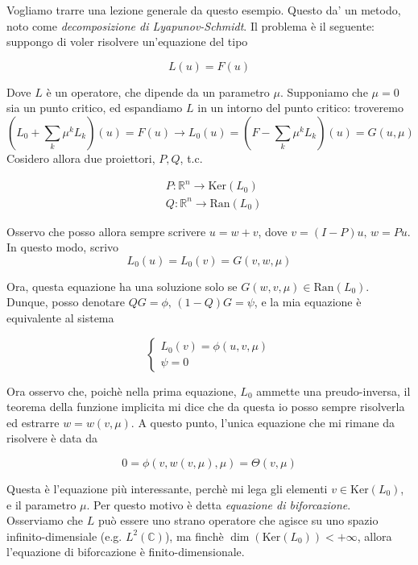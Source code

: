 \documentclass{report}
\begin{document}
Vogliamo trarre una lezione generale da questo esempio. Questo da' un metodo, noto come \emph{decomposizione di Lyapunov-Schmidt}. Il problema è il seguente: suppongo di voler risolvere un'equazione del tipo 

\begin{equation}
    L(u) = F(u)
\end{equation}


Dove $L$ è un operatore, che dipende da un parametro $\mu$. Supponiamo che $\mu=0$ sia un punto critico, ed espandiamo $L$ in un intorno del punto critico: troveremo
\begin{equation}
    \left(L_0 + \sum_k \mu^kL_k \right)(u) = F(u) \rightarrow L_0 (u) = \left(F -\sum_k \mu^kL_k\right) (u) = G(u, \mu)
\end{equation}
Cosidero allora due proiettori, $P, Q$, t.c. 

\begin{align}
    &P: \mathbb{R}^n \rightarrow \text{Ker}(L_0)  \\
    & Q: \mathbb{R}^n \rightarrow \text{Ran}(L_0)
\end{align}

Osservo che posso allora sempre scrivere $u = w + v$, dove $v = (I-P)u, \, w = Pu$. In questo modo, scrivo 
\begin{equation}
    L_0(u) = L_0(v) = G(v, w,  \mu)
\end{equation}

Ora, questa equazione ha una soluzione solo se $G(w, v, \mu) \in \text{Ran}(L_0)$. Dunque, posso denotare $QG = \phi, \, (1-Q)G = \psi$, e la mia equazione è equivalente al sistema 

\[\begin{cases}
    L_0(v) = \phi(u, v, \mu) \\ \psi = 0 
\end{cases}\]

Ora osservo che, poichè nella prima equazione, $L_0$ ammette una preudo-inversa, il teorema della funzione implicita mi dice che da questa io posso sempre risolverla ed estrarre $w = w(v, \mu)$. A questo punto, l'unica equazione che mi rimane da risolvere è data da 

\begin{equation}
    0 = \phi(v, w(v, \mu), \mu) = \Theta(v, \mu)
\end{equation}

Questa è l'equazione più interessante, perchè mi lega gli elementi $v \in \text{Ker}(L_0)$, e il parametro $\mu$. Per questo motivo è detta \emph{equazione di biforcazione}. \\ Osserviamo che $L$ può essere uno strano operatore che agisce su uno spazio infinito-dimensiale (e.g. $L^2(\mathbb{C})$), ma finchè $\dim(\text{Ker}(L_0)) < + \infty$, allora l'equazione di biforcazione è finito-dimensionale. \\ 
\end{document}
